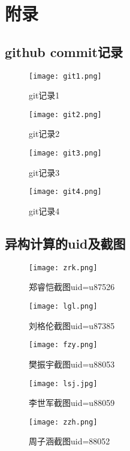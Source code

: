 \appendix
\chapter*{附录}
\section*{github commit记录}
\begin{figure}[htbp]
    \centering
    \texttt{[image: git1.png]}
    \caption{git记录1}\label{fig:git1}
    \vspace{\baselineskip}
    \end{figure}
    \begin{figure}[htbp]
        \centering
        \texttt{[image: git2.png]}
        \caption{git记录2}\label{fig:git2}
        \vspace{\baselineskip}
        \end{figure} 
        \begin{figure}[htbp]
            \centering
            \texttt{[image: git3.png]}
            \caption{git记录3}\label{fig:git3}
            \vspace{\baselineskip}
            \end{figure} 
            \begin{figure}[htbp]
                \centering
                \texttt{[image: git4.png]}
                \caption{git记录4}\label{fig:git4}
                \vspace{\baselineskip}
                \end{figure}      
    \clearpage
\section*{异构计算的uid及截图}

\begin{figure}[htbp]
\centering
\texttt{[image: zrk.png]}
\caption{郑睿恺截图uid=u87526}\label{fig:zrk}
\vspace{\baselineskip}
\end{figure}
\begin{figure}[h]
\centering
\texttt{[image: lgl.png]}
\caption{刘格伦截图uid=u87385}\label{fig:lgl}
\vspace{\baselineskip}
\end{figure}
\begin{figure}[h]
\centering
\texttt{[image: fzy.png]}
\caption{樊振宇截图uid=u88053}\label{fig:fzy}
\vspace{\baselineskip}
\end{figure}    
\begin{figure}[h]
\centering
\texttt{[image: lsj.jpg]}
\caption{李世军截图uid=u88059}\label{fig:lsj}
\vspace{\baselineskip}
\end{figure}
\begin{figure}[h]
\centering
\texttt{[image: zzh.png]}
\caption{周子涵截图uid=88052}\label{fig:zzh}
\vspace{\baselineskip}
\end{figure}
\clearpage
